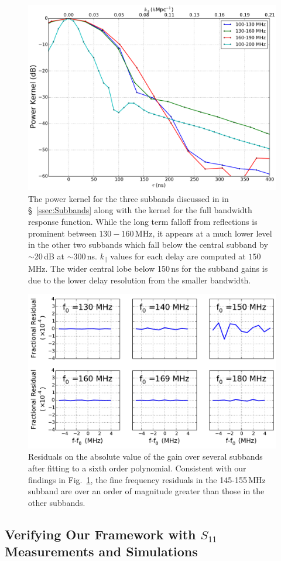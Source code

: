 \documentclass[twocolumn]{emulateapj}
\begin{document}
\begin{figure}[h!]
\includegraphics[width=.5\textwidth]{figures/powerKernelSubbands.pdf}
\caption{The power kernel for the three subbands discussed in in \S~\ref{ssec:Subbands} along with the kernel for the full bandwidth response function. While the long term falloff from reflections is prominent between $130-160$\,MHz, it appears at a much lower level in the other two subbands which fall below the central subband by $\sim 20$\,dB at $\sim 300$\,ns. $k_\parallel$ values for each delay are computed at $150$\,MHz. The wider central lobe below 150\,ns for the subband gains is due to the lower delay resolution from the smaller bandwidth.}
\label{fig:KernelsSubbands}
\end{figure}

\begin{figure}
\includegraphics[width=.5\textwidth]{figures/frequency_domain_residuals.pdf}
\caption{Residuals on the absolute value of the gain over several subbands after fitting to a sixth order polynomial. Consistent with our findings in Fig.~\ref{fig:KernelsSubbands}, the fine frequency residuals in the 145-155\,MHz subband are over an order of magnitude greater than those in the other subbands.}
\label{fig:Residuals}
\end{figure}

\subsection{Verifying Our Framework with $S_{11}$ Measurements and Simulations}\label{ssec:S11}
\end{document}
